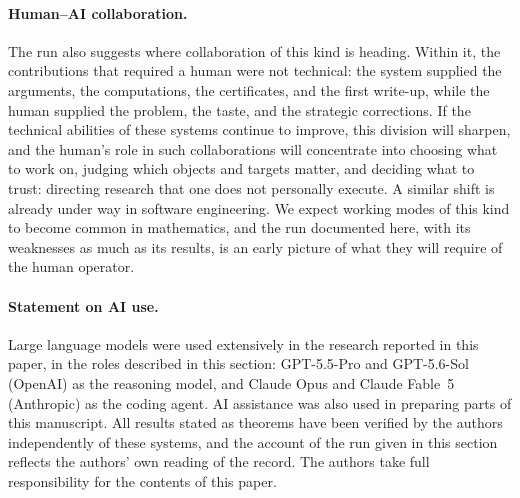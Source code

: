 \paragraph{Human--AI collaboration.}
The run also suggests where collaboration of this kind is heading. Within
it, the contributions that required a human were not technical: the system
supplied the arguments, the computations, the certificates, and the first
write-up, while the human supplied the problem, the taste, and the
strategic corrections. If the technical abilities of these systems continue
to improve, this division will sharpen, and the human's role in
such collaborations will concentrate into choosing what to work on, judging
which objects and targets matter, and deciding what to trust: directing
research that one does not personally execute. A similar shift is already
under way in software engineering. We expect working modes of this kind to
become common in mathematics, and the run documented here, with its
weaknesses as much as its results, is an early picture of what they will
require of the human operator.

\paragraph{Statement on AI use.}
Large language models were used extensively in the research reported in
this paper, in the roles described in this section: GPT-5.5-Pro and
GPT-5.6-Sol (OpenAI) as the reasoning model, and Claude Opus and Claude
Fable~5 (Anthropic) as the coding agent. AI assistance was also used in
preparing parts of this manuscript. All results stated as theorems have been
verified by the authors independently of these systems, and the account of
the run given in this section reflects the authors' own reading of the
record. The authors take full responsibility for the contents of this
paper.

